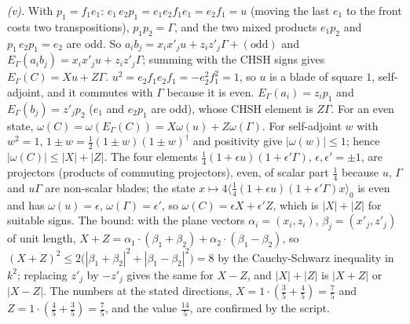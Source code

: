 \emph{(v).} With $p_{1} = f_{1}e_{1}$: $e_{1}\,e_{2}p_{1} = e_{1}e_{2}f_{1}e_{1} = e_{2}f_{1} = u$ (moving the last $e_{1}$ to the front costs two transpositions), $p_{1}p_{2} = \Gamma$, and the two mixed products $e_{1}p_{2}$ and $p_{1}\,e_{2}p_{1} = e_{2}$ are odd. So $a_{i}b_{j} = x_{i}x'_{j}u + z_{i}z'_{j}\Gamma + (\text{odd})$ and $E_{\Gamma}(a_{i}b_{j}) = x_{i}x'_{j}u + z_{i}z'_{j}\Gamma$; summing with the CHSH signs gives $E_{\Gamma}(C) = Xu + Z\Gamma$. $u^{2} = e_{2}f_{1}e_{2}f_{1} = -e_{2}^{2}f_{1}^{2} = 1$, so $u$ is a blade of square $1$, self-adjoint, and it commutes with $\Gamma$ because it is even. $E_{\Gamma}(a_{i}) = z_{i}p_{1}$ and $E_{\Gamma}(b_{j}) = z'_{j}p_{2}$ ($e_{1}$ and $e_{2}p_{1}$ are odd), whose CHSH element is $Z\Gamma$. For an even state, $\omega(C) = \omega(E_{\Gamma}(C)) = X\omega(u) + Z\omega(\Gamma)$. For self-adjoint $w$ with $w^{2} = 1$, $1 \pm w = \tfrac12(1 \pm w)(1 \pm w)^{\dagger}$ and positivity give $|\omega(w)| \le 1$; hence $|\omega(C)| \le |X| + |Z|$. The four elements $\tfrac14(1 + \epsilon u)(1 + \epsilon'\Gamma)$, $\epsilon, \epsilon' = \pm 1$, are projectors (products of commuting projectors), even, of scalar part $\tfrac14$ because $u$, $\Gamma$ and $u\Gamma$ are non-scalar blades; the state $x \mapsto 4\langle\tfrac14(1 + \epsilon u)(1 + \epsilon'\Gamma)x\rangle_{0}$ is even and has $\omega(u) = \epsilon$, $\omega(\Gamma) = \epsilon'$, so $\omega(C) = \epsilon X + \epsilon'Z$, which is $|X| + |Z|$ for suitable signs. The bound: with the plane vectors $\alpha_{i} = (x_{i}, z_{i})$, $\beta_{j} = (x'_{j}, z'_{j})$ of unit length, $X + Z = \alpha_{1} \cdot (\beta_{1} + \beta_{2}) + \alpha_{2} \cdot (\beta_{1} - \beta_{2})$, so $(X + Z)^{2} \le 2\bigl(|\beta_{1} + \beta_{2}|^{2} + |\beta_{1} - \beta_{2}|^{2}\bigr) = 8$ by the Cauchy-Schwarz inequality in $k^{2}$; replacing $z'_{j}$ by $-z'_{j}$ gives the same for $X - Z$, and $|X| + |Z|$ is $|X + Z|$ or $|X - Z|$. The numbers at the stated directions, $X = 1 \cdot (\tfrac35 + \tfrac45) = \tfrac75$ and $Z = 1 \cdot (\tfrac45 + \tfrac35) = \tfrac75$, and the value $\tfrac{14}{5}$, are confirmed by the script.
